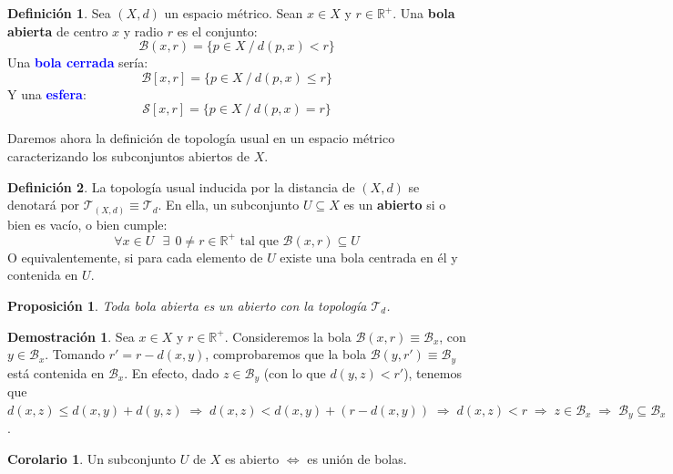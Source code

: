 \documentclass[12pt,twoside]{report}
\newcommand\mc[1]{\mathcal{#1}}
\theoremstyle{azul}
\theoremstyle{azul2}
\theoremstyle{plain}
\newtheorem*{prop}{Proposición}
\theoremstyle{definition}
\newtheorem*{defi}{Definición}
\newtheorem*{dem}{Demostración}
\newtheorem*{cor}{Corolario}
\theoremstyle{remark}
\begin{document}
\begin{defi}
Sea $(X,d)$ un espacio m{\'e}trico. Sean $x \in X$ y $r \in \mathbb{R}^+$. Una \textbf{bola abierta} de centro $x$ y radio $r$ es el conjunto:
$$\mathcal{B}(x,r)=\{ p \in X \: / \: d(p,x) < r\}$$
Una \textcolor{blue}{\textbf{bola cerrada}} sería:
$$\mathcal{B}[x,r]=\{ p \in X \: / \: d(p,x) \leq r\}$$
Y una \textcolor{blue}{\textbf{esfera}}:
$$\mathcal{S}[x,r]=\{ p \in X \: / \: d(p,x) = r\}$$
\end{defi}

Daremos ahora la definición de topología usual en un espacio métrico caracterizando los subconjuntos abiertos de $X$.

\begin{defi}
La topología usual inducida por la distancia de $(X,d)$ se denotará por $\mc{T}_{(X,d)} \equiv \mc{T}_d$. En ella, un subconjunto $U \subseteq X$ es un \textbf{abierto} si o bien es vacío, o bien cumple: 
$$\forall x \in U \: \: \: \exists \: \: 0 \neq r \in \mathbb{R}^+ \text{ tal que } \mathcal{B}(x,r) \subseteq U$$
O equivalentemente, si para cada elemento de $U$ existe una bola centrada en él y contenida en $U$.
\end{defi}

\begin{prop}
Toda bola abierta es un abierto con la topología $\mc{T}_d$.
\end{prop}
\begin{dem}
Sea $x\in X$ y $r \in \mathbb{R}^+$. Consideremos la bola $\mc{B}(x,r) \equiv \mc{B}_x$, con $y \in \mc{B}_x$. Tomando $r' = r - d(x,y)$, comprobaremos que la bola $\mc{B}(y,r') \equiv \mc{B}_y$ está contenida en $\mc{B}_x$. En efecto, dado $z\in \mc{B}_y$ (con lo que $d(y,z) < r'$), tenemos que $d(x,z) \leq d(x,y) + d(y,z) \;\Rightarrow \; d(x,z) < d(x,y) + (r - d(x,y)) \;\Rightarrow\; d(x,z) < r \;\Rightarrow \; z \in \mc{B}_x \;\Rightarrow \; \mc{B}_y \subseteq \mc{B}_x$.
\end{dem}
\begin{cor}
Un subconjunto $U$ de $X$ es abierto $\iff$ es unión de bolas.
\end{cor}
\newpage
\end{document}
